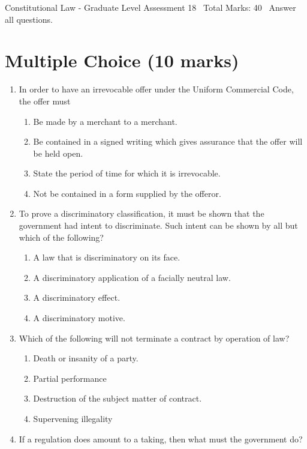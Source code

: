 \documentclass[12pt]{article}
\begin{document}
\begin{center}
Constitutional Law - Graduate Level Assessment 18 \
Total Marks: 40 \
Answer all questions.
\end{center}

\section*{Multiple Choice (10 marks)}
\begin{enumerate}[label=\arabic*.]
\item In order to have an irrevocable offer under the Uniform Commercial Code, the offer must
\begin{enumerate}[label=(\alph*)]
    \item Be made by a merchant to a merchant.
    \item Be contained in a signed writing which gives assurance that the offer will be held open.
    \item State the period of time for which it is irrevocable.
    \item Not be contained in a form supplied by the offeror.
\end{enumerate}
\item To prove a discriminatory classification, it must be shown that the government had intent to discriminate. Such intent can be shown by all but which of the following?
\begin{enumerate}[label=(\alph*)]
    \item A law that is discriminatory on its face.
    \item A discriminatory application of a facially neutral law.
    \item A discriminatory effect.
    \item A discriminatory motive.
\end{enumerate}
\item Which of the following will not terminate a contract by operation of law?
\begin{enumerate}[label=(\alph*)]
    \item Death or insanity of a party.
    \item Partial performance
    \item Destruction of the subject matter of contract.
    \item Supervening illegality
\end{enumerate}
\item If a regulation does amount to a taking, then what must the government do?
\begin{enumerate}[label=(\alph*)]

\end{enumerate}
\end{enumerate}
\end{document}

